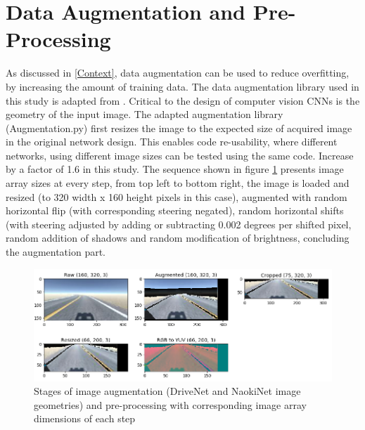 \section{Data Augmentation and Pre-Processing}
\label{met:data-aug-pre-proc}
As discussed in \ref{Context}, data augmentation can be used to reduce overfitting, by increasing the amount of training data. The data augmentation library used in this study is adapted from \cite{Naoki2016}. Critical to the design of computer vision CNNs is the geometry of the input image. The adapted augmentation library (Augmentation.py) first resizes the image to the expected size of acquired image in the original network design. This enables code re-usability, where different networks, using different image sizes can be tested using the same code. 
Increase by a factor of 1.6 in this study.
The sequence shown in figure \ref{fig:augpreproc} presents image array sizes at every step, from top left to bottom right, the image is loaded and resized (to 320 width x 160 height pixels in this case), augmented with random horizontal flip (with corresponding steering negated), random horizontal shifts (with steering adjusted by adding or subtracting 0.002 degrees per shifted pixel, random addition of shadows and random modification of brightness, concluding the augmentation part.
\begin{figure}[h!]
 \centering 
 \includegraphics[width=\textwidth]{Figures/AugmentationPreProcessing.png}
 \caption{Stages of image augmentation (DriveNet and NaokiNet image geometries) and pre-processing with corresponding image array dimensions of each step}
 \label{fig:augpreproc}
\end{figure}

